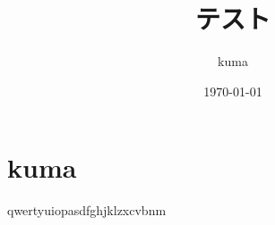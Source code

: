 \documentclass[a4paper,titlepage,fontsize=10pt]{jlreq}
\title{テスト}
\author{kuma}
\date{\today}
\begin{document}
\maketitle

\section{kuma}
qwertyuiopasdfghjklzxcvbnm \cite{kuma}

\printbibliography[title=参考文献]
\end{document}
